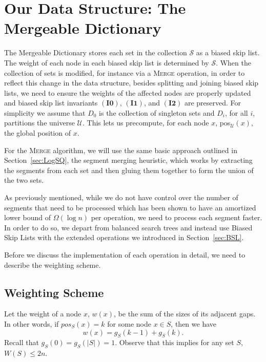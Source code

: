 \documentclass[11pt]{article}
\newcommand{\Ds}{Mergeable Dictionary}
\newcommand{\kwUnion}{Merge}
\newcommand{\Union}{\mbox{\textsc{\kwUnion{}}}}
\newcommand{\segments}{{\segment}s}
\newcommand{\segment}{segment}
\newcommand{\invzero}{\ensuremath{\mathbf{(I0)}}}
\newcommand{\invone}{\ensuremath{\mathbf{(I1)}}}
\newcommand{\invtwo}{\ensuremath{\mathbf{(I2)}}}
\newcommand{\universe}{\ensuremath{\mathcal U}}
\newcommand{\setweight}[1]{{\ensuremath{W(\set #1)}}}
\newcommand{\nodeweight}[1]{{\ensuremath{w(\node #1)}}}
\newcommand{\node}[1]{\ensuremath{#1}}
\newcommand{\nodeposition}[2]{pos\ensuremath{_{\set #1}(\node #2)}}
\newcommand{\set}[1]{\ensuremath{#1}}
\newcommand{\collection}[1]{\ensuremath{\mathcal #1}}
\newcommand{\numgap}[2]{\ensuremath{g_{\set #1}(#2)}}
\newcommand{\datast}[1]{\ensuremath{D_{#1}}}
\begin{document}
\section{Our Data Structure: The Mergeable Dictionary} 
\label{sec:DS} 


The \Ds{} stores each set in the collection \collection S as a biased skip list.  The weight of each node in each biased skip list is determined by \collection S. When the collection of sets is modified, for instance via a \Union{} operation, in order to reflect this change in the data structure, besides splitting and joining biased skip lists, we need to ensure the weights of the affected nodes are properly updated and biased skip list invariants \invzero{}, \invone{}, and \invtwo{} are preserved. For simplicity we assume that \datast 0 is the collection of singleton sets and \datast i, for all $i$, partitions the universe \universe. This lets us precompute, for each node \node x, \nodeposition{\universe}{x}, the global position of \node x. 
  
For the \Union{} algorithm, we will use the same basic approach outlined in Section~\ref{sec:LogSQ}, the \segment{} merging heuristic, which works by extracting the \segments{} from each set and then gluing them together to form the union of the two sets. 

As previously mentioned, while we do not have control over the number of \segments{} that need to be processed which has been shown to have an amortized lower bound of $\Omega(\log n)$ per operation, we need to process each \segment{} faster. In order to do so, we depart from balanced search trees and instead use Biased Skip Lists \cite{journals/algorithmica/BagchiBG05} with the extended operations we introduced in Section~\ref{sec:BSL}. 

  
Before we discuss the implementation of each operation in detail, we need to describe the weighting scheme. 

\subsection{Weighting Scheme} 
\label{subsec:DSWeights} 
Let the weight of a node $x$, $\nodeweight x$, be the sum of the sizes of its adjacent gaps. In other words, if $\nodeposition{S}{x} = k$ for some node $x\in S$, then we have 
\[ 
\label{eqn:weight} 
\nodeweight x = \numgap{S}{k-1} +\numgap{S}{k}. 
\] 
Recall that $\numgap{S}{0} = \numgap{S}{|\set S|} = 1$. Observe that this implies for any set \set S, $\setweight S \leq 2n$. 
\end{document}
